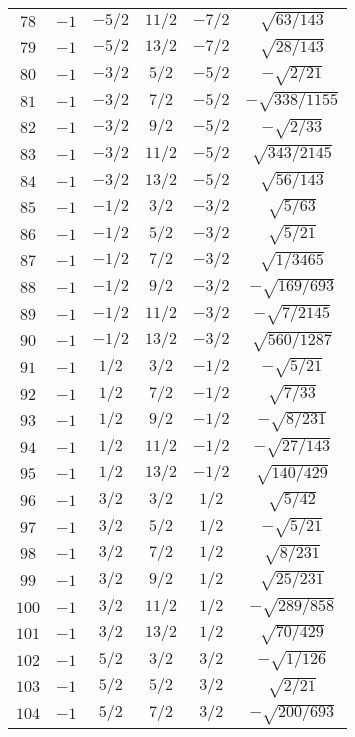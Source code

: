 \begin{table}
\begin{center}
\begin{tabular}{|c|c|c|c|c|c|}
$78$ & $-1$ & $-5/2$ & $11/2$ & $-7/2$ & $\sqrt{63/143}$ \\ 
$79$ & $-1$ & $-5/2$ & $13/2$ & $-7/2$ & $\sqrt{28/143}$ \\ 
$80$ & $-1$ & $-3/2$ & $5/2$ & $-5/2$ & $-\sqrt{2/21}$ \\ 
$81$ & $-1$ & $-3/2$ & $7/2$ & $-5/2$ & $-\sqrt{338/1155}$ \\ 
$82$ & $-1$ & $-3/2$ & $9/2$ & $-5/2$ & $-\sqrt{2/33}$ \\ 
$83$ & $-1$ & $-3/2$ & $11/2$ & $-5/2$ & $\sqrt{343/2145}$ \\ 
$84$ & $-1$ & $-3/2$ & $13/2$ & $-5/2$ & $\sqrt{56/143}$ \\ 
$85$ & $-1$ & $-1/2$ & $3/2$ & $-3/2$ & $\sqrt{5/63}$ \\ 
$86$ & $-1$ & $-1/2$ & $5/2$ & $-3/2$ & $\sqrt{5/21}$ \\ 
$87$ & $-1$ & $-1/2$ & $7/2$ & $-3/2$ & $\sqrt{1/3465}$ \\ 
$88$ & $-1$ & $-1/2$ & $9/2$ & $-3/2$ & $-\sqrt{169/693}$ \\ 
$89$ & $-1$ & $-1/2$ & $11/2$ & $-3/2$ & $-\sqrt{7/2145}$ \\ 
$90$ & $-1$ & $-1/2$ & $13/2$ & $-3/2$ & $\sqrt{560/1287}$ \\ 
$91$ & $-1$ & $1/2$ & $3/2$ & $-1/2$ & $-\sqrt{5/21}$ \\ 
$92$ & $-1$ & $1/2$ & $7/2$ & $-1/2$ & $\sqrt{7/33}$ \\ 
$93$ & $-1$ & $1/2$ & $9/2$ & $-1/2$ & $-\sqrt{8/231}$ \\ 
$94$ & $-1$ & $1/2$ & $11/2$ & $-1/2$ & $-\sqrt{27/143}$ \\ 
$95$ & $-1$ & $1/2$ & $13/2$ & $-1/2$ & $\sqrt{140/429}$ \\ 
$96$ & $-1$ & $3/2$ & $3/2$ & $1/2$ & $\sqrt{5/42}$ \\ 
$97$ & $-1$ & $3/2$ & $5/2$ & $1/2$ & $-\sqrt{5/21}$ \\ 
$98$ & $-1$ & $3/2$ & $7/2$ & $1/2$ & $\sqrt{8/231}$ \\ 
$99$ & $-1$ & $3/2$ & $9/2$ & $1/2$ & $\sqrt{25/231}$ \\ 
$100$ & $-1$ & $3/2$ & $11/2$ & $1/2$ & $-\sqrt{289/858}$ \\ 
$101$ & $-1$ & $3/2$ & $13/2$ & $1/2$ & $\sqrt{70/429}$ \\ 
$102$ & $-1$ & $5/2$ & $3/2$ & $3/2$ & $-\sqrt{1/126}$ \\ 
$103$ & $-1$ & $5/2$ & $5/2$ & $3/2$ & $\sqrt{2/21}$ \\ 
$104$ & $-1$ & $5/2$ & $7/2$ & $3/2$ & $-\sqrt{200/693}$ \\ 

\end{tabular}
\end{center}
\end{table}
